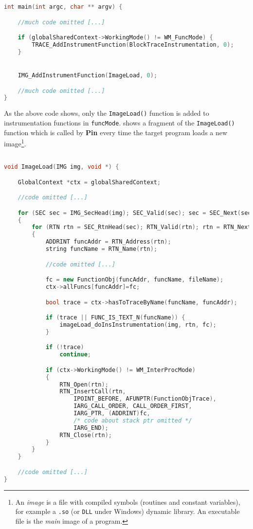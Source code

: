 \documentclass[a4paper,10pt]{report}
\begin{document}
\begin{lstlisting}[language=C++,
	caption={a fragment of main() routine},
	label=main1, frame=leftline]
int main(int argc, char ** argv) {

	//much code omitted [...]

	if (globalSharedContext->WorkingMode() != WM_FuncMode) {
		TRACE_AddInstrumentFunction(BlockTraceInstrumentation, 0);
	}


	IMG_AddInstrumentFunction(ImageLoad, 0);

	//much code omitted [...]
}

\end{lstlisting}

As the above code shows, only the \verb|ImageLoad()| function is added to instrumentation
functions in \verb|funcMode|.
 shows a fragment of the \verb|ImageLoad()| function which
is called by \textbf{Pin} every time the target program loads a new
image\footnote{An \emph{image} is a file with compiled symbols (routines and constant variables), for example a \texttt{.so} (or \texttt{DLL} under Windows) dynamic library.
An executable file is the \emph{main} image of a program.}.

\begin{lstlisting}[language=C++,
	caption={a fragment of ImageLoad() routine},
	label=imgload, frame=leftline]

void ImageLoad(IMG img, void *) {

	GlobalContext *ctx = globalSharedContext;

	//code omitted [...]

	for (SEC sec = IMG_SecHead(img); SEC_Valid(sec); sec = SEC_Next(sec))
	{
		for (RTN rtn = SEC_RtnHead(sec); RTN_Valid(rtn); rtn = RTN_Next(rtn))
		{
			ADDRINT funcAddr = RTN_Address(rtn);
			string funcName = RTN_Name(rtn);

			//code omitted [...]

			fc = new FunctionObj(funcAddr, funcName, fileName);
			ctx->allFuncs[funcAddr]=fc;

			bool trace = ctx->hasToTraceByName(funcName, funcAddr);

			if (trace || FUNC_IS_TEXT_N(funcName)) {
				imageLoad_doInsInstrumentation(img, rtn, fc);
			}

			if (!trace)
				continue;

			if (ctx->WorkingMode() != WM_InterProcMode)
			{
				RTN_Open(rtn);
				RTN_InsertCall(rtn,
					IPOINT_BEFORE, AFUNPTR(FunctionObjTrace),
					IARG_CALL_ORDER, CALL_ORDER_FIRST,
					IARG_PTR, (ADDRINT)fc,
					/* code about stack ptr omitted */
					IARG_END);
				RTN_Close(rtn);
			}
		}
	}

	//code omitted [...]
}

\end{lstlisting}
\end{document}
